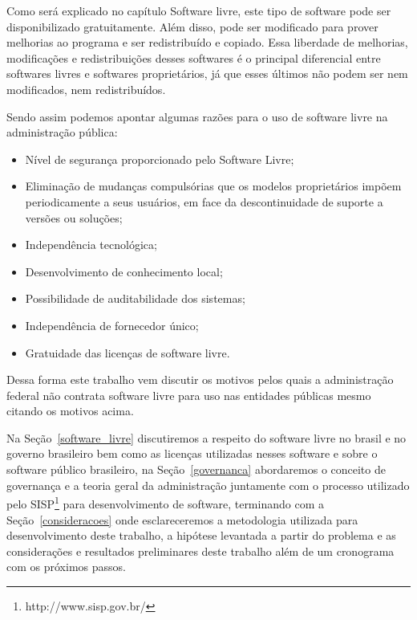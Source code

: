 Como será explicado no capítulo Software livre, este tipo de software pode ser disponibilizado
gratuitamente. Além disso, pode ser modificado para prover melhorias ao
programa e ser redistribuído e copiado. Essa liberdade de melhorias, modificações e redistribuições
desses softwares é o principal diferencial entre softwares livres e softwares proprietários, já que
esses últimos não podem ser nem modificados, nem redistribuídos.

Sendo assim podemos apontar algumas razões para o uso de software livre na administração 
pública:

\begin{itemize}

\item Nível de segurança proporcionado pelo Software Livre;
\item Eliminação de mudanças compulsórias que os modelos proprietários impõem
periodicamente a seus usuários, em face da descontinuidade de suporte a
versões ou soluções; 
\item Independência tecnológica; 
\item Desenvolvimento de conhecimento local; 
\item Possibilidade de auditabilidade dos sistemas;
\item Independência de fornecedor único;
\item Gratuidade das licenças de software livre.
\end{itemize}

Dessa forma este trabalho vem discutir os motivos pelos quais a administração 
federal não contrata software livre para uso nas entidades públicas mesmo citando 
os motivos acima.

Na Seção~\ref{software_livre} discutiremos a respeito do software livre no brasil e no governo 
brasileiro bem como as licenças utilizadas nesses software e sobre o software público 
brasileiro,
%
na Seção~\ref{governanca} abordaremos o conceito de governança e a teoria geral
da administração juntamente com o processo utilizado pelo SISP\footnote{http://www.sisp.gov.br/}
para desenvolvimento de software,
%
terminando com a Seção~\ref{consideracoes} onde esclareceremos a metodologia utilizada para desenvolvimento
deste trabalho, a hipótese levantada a partir do problema e as considerações e resultados preliminares 
deste trabalho além de um cronograma com os próximos passos. 


